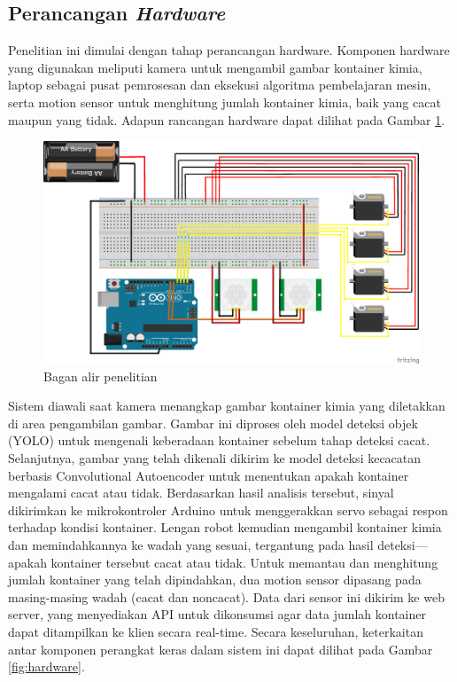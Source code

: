 \vspace{1em}

\subsection{Perancangan \textit{Hardware}}
Penelitian ini dimulai dengan tahap perancangan hardware. Komponen
hardware yang digunakan meliputi kamera untuk mengambil gambar
kontainer kimia, laptop sebagai pusat pemrosesan dan eksekusi
algoritma pembelajaran mesin, serta motion sensor untuk menghitung
jumlah kontainer kimia, baik yang cacat maupun yang tidak. Adapun
rancangan hardware dapat dilihat pada Gambar \ref{fig:rangkaian}.

\begin{figure}[H]
  \centering
  \includegraphics[width=\textwidth]{gambar/rangkaian.png}
  \caption{Bagan alir penelitian}
  \label{fig:rangkaian}
\end{figure}
\vspace{-1em}

Sistem diawali saat kamera menangkap gambar kontainer kimia yang
diletakkan di area pengambilan gambar. Gambar ini diproses oleh model
deteksi objek (YOLO) untuk mengenali keberadaan kontainer sebelum
tahap deteksi cacat. Selanjutnya, gambar yang telah dikenali dikirim
ke model deteksi kecacatan berbasis Convolutional Autoencoder untuk
menentukan apakah kontainer mengalami cacat atau tidak. Berdasarkan
hasil analisis tersebut, sinyal dikirimkan ke mikrokontroler Arduino
untuk menggerakkan servo sebagai respon terhadap kondisi kontainer.
Lengan robot kemudian mengambil kontainer kimia dan memindahkannya ke
wadah yang sesuai, tergantung pada hasil deteksi—apakah kontainer
tersebut cacat atau tidak. Untuk memantau dan menghitung jumlah
kontainer yang telah dipindahkan, dua motion sensor dipasang pada
masing-masing wadah (cacat dan noncacat). Data dari sensor ini
dikirim ke web server, yang menyediakan API untuk dikonsumsi agar
data jumlah kontainer dapat ditampilkan ke klien secara real-time.
Secara keseluruhan, keterkaitan antar komponen perangkat keras dalam
sistem ini dapat dilihat pada Gambar \ref{fig:hardware}.

